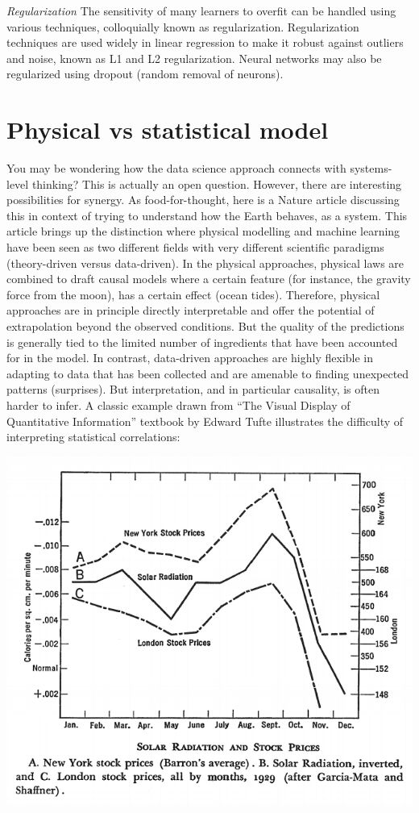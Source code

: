 \documentclass[
]{book}
\begin{document}
\emph{Regularization}
The sensitivity of many learners to overfit can be handled using various techniques, colloquially known as regularization. Regularization techniques are used widely in linear regression to make it robust against outliers and noise, known as L1 and L2 regularization. Neural networks may also be regularized using dropout (random removal of neurons).

\hypertarget{physical-vs-statistical-model}{%
\section{Physical vs statistical model}\label{physical-vs-statistical-model}}

You may be wondering how the data science approach connects with systems-level thinking? This is actually an open question. However, there are interesting possibilities for synergy. As food-for-thought, here is a Nature article discussing this in context of trying to understand how the Earth behaves, as a system. This article brings up the distinction where physical modelling and machine learning have been seen as two different fields with very different scientific paradigms (theory-driven versus data-driven). In the physical approaches, physical laws are combined to draft causal models where a certain feature (for instance, the gravity force from the moon), has a certain effect (ocean tides). Therefore, physical approaches are in principle directly interpretable and offer the potential of extrapolation beyond the observed conditions. But the quality of the predictions is generally tied to the limited number of ingredients that have been accounted for in the model. In contrast, data-driven approaches are highly flexible in adapting to data that has been collected and are amenable to finding unexpected patterns (surprises). But interpretation, and in particular causality, is often harder to infer. A classic example drawn from ``The Visual Display of Quantitative Information'' textbook by Edward Tufte illustrates the difficulty of interpreting statistical correlations:

\includegraphics{assets/StockvsRadiation.png}
\end{document}
